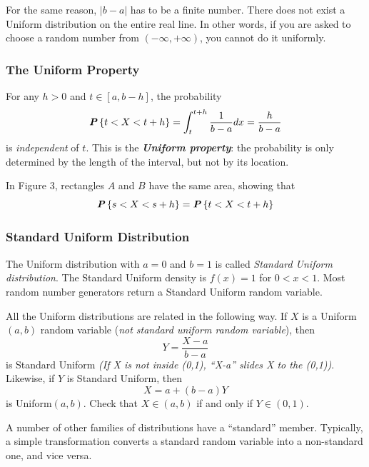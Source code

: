 For the same reason, $| b - a |$ has to be a finite number. There does not exist a Uniform distribution on the entire real line. In other words, if you are asked to choose a random number from $(-\infty, +\infty)$, you cannot do it uniformly.

\subsubsection{The Uniform Property}

For any $h > 0$ and $t \in \left[ a, b - h \right]$, the probability
\begin{equation*}
    \textbf{\textit{P}}\left\{t < X < t + h\right\} = \int_t^{t+h} \frac{1}{b - a} dx = \frac{h}{b - a}
\end{equation*}
is \textit{independent} of $t$. This is the \textit{\textbf{Uniform property}}: the probability is only determined by the length of the interval, but not by its location.

\begin{example}{}
In Figure 3, rectangles $A$ and $B$ have the same area, showing that
\begin{equation*}
    \textbf{\textit{P}}\left\{s < X < s + h\right\} = \textbf{\textit{P}}\left\{t < X < t + h\right\}
\end{equation*}
\end{example}

\subsubsection{Standard Uniform Distribution}

The Uniform distribution with $a = 0$ and $b = 1$ is called \textit{Standard Uniform distribution}. The Standard Uniform density is $f(x) = 1$ for $0 < x < 1$. Most random number generators return a Standard Uniform random variable.

All the Uniform distributions are related in the following way. If $X$ is a Uniform$(a, b)$ random variable (\textit{not standard uniform random variable}), then
\begin{equation*}
    Y = \frac{X - a}{b - a}
\end{equation*}
is Standard Uniform \textit{(If X is not inside (0,1), ``X-a'' slides X to the (0,1))}. Likewise, if $Y$ is Standard Uniform, then
\begin{equation*}
    X = a + (b-a)Y
\end{equation*}
is Uniform$(a, b)$. Check that $X \in (a, b)$ if and only if $Y \in (0, 1)$.

A number of other families of distributions have a ``standard'' member. Typically, a simple transformation converts a standard random variable into a non-standard one, and vice versa.

